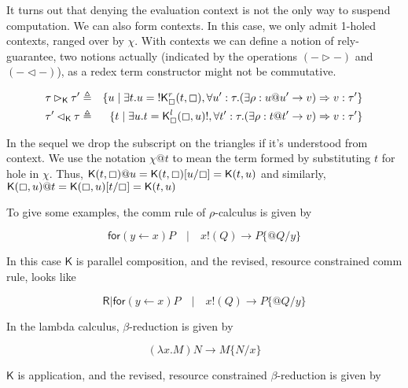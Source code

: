 \documentclass{llncs}
\renewcommand{\:}{\colon}
\newcommand{\rhoc}{$\rho$-calculus}
\begin{document}
It turns out that denying the evaluation context is not the only way
to suspend computation. We can also form contexts. In this case, we
only admit 1-holed contexts, ranged over by $\chi$. With contexts we can
define a notion of rely-guarantee, two notions actually (indicated by
the operations $(- \rhd -)$ and $(- \lhd -)$), as a redex term constructor
might not be commutative.

\begin{eqnarray*}
\tau \rhd_{\mathsf{K}} \tau' & \triangleq & \{ u \; | \; \exists t. u = \mathsf{!}\mathsf{K}_{\boxempty}^{r}(t, \boxempty),\forall u' : \tau. (\exists \rho : u@u' \rightarrow v) \Rightarrow v:\tau' \} \\
\tau' \lhd_{\mathsf{K}} \tau & \triangleq & \{ t \; | \; \exists u. t = \mathsf{K}_{\boxempty}^{l}(\boxempty, u)\mathsf{!},\forall t' : \tau. (\exists \rho: t@t' \rightarrow v) \Rightarrow v : \tau' \}
\end{eqnarray*}

In the sequel we drop the subscript on the triangles if it's understood from
context. We use the notation $\chi @ t$ to mean the term formed by
substituting $t$ for hole in $\chi$. Thus, $\mathsf{K}(t, \boxempty)@u = \mathsf{K}(t, \boxempty)[u/\boxempty] = \mathsf{K}(t,u)$ and similarly, $\mathsf{K}(\boxempty, u)@t = \mathsf{K}(\boxempty, u)[t/\boxempty] = \mathsf{K}(t,u)$

To give some examples, the comm rule of {\rhoc} is given by

\begin{equation*}
  \mathsf{for}( y \leftarrow x )P \quad | \quad x\mathsf{!}(Q) \rightarrow P\{ @Q/y \}
\end{equation*}

In this case $\mathsf{K}$ is parallel composition, and the revised, resource
constrained comm rule, looks like

\begin{equation*}
  \mathsf{R} | \mathsf{for}( y \leftarrow x )P \quad | \quad x\mathsf{!}(Q) \rightarrow P\{ @Q/y \}
\end{equation*}

In the lambda calculus, $\beta$-reduction is given by

\begin{equation*}
  (\lambda x.M)N \rightarrow M\{ N/x \}
\end{equation*}  

$\mathsf{K}$ is application, and the revised, resource constrained $\beta$-reduction is given by
\end{document}
